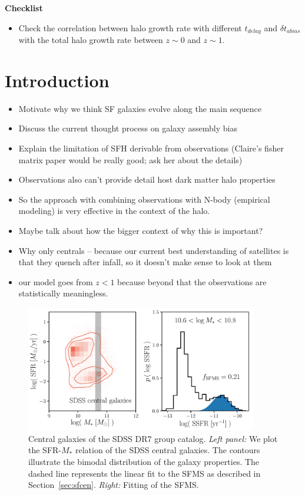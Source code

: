 \documentclass[12pt, letterpaper, preprint]{aastex}
\newcommand{\bitem}{\begin{itemize}}
\newcommand{\eitem}{\end{itemize}}
\begin{document}
{\bf Checklist} 
\bitem
\item Check the correlation between halo growth rate with different $t_{delay}$ and $\delta t_{abias}$ with the total halo growth rate between $z \sim 0$ and $z \sim 1$. 
\eitem 

\section{Introduction}
\bitem 
\item Motivate why we think SF galaxies evolve along the main sequence  
\item Discuss the current thought process on galaxy assembly bias 
\item Explain the limitation of SFH derivable from observations (Claire's fisher matrix paper would be really good; ask her about the details) 
\item Observations also can't provide detail host dark matter halo properties
\item So the approach with combining observations with N-body (empirical modeling) is very effective in the context of the halo.
\item Maybe talk about how the bigger context of why this is important?  
\item Why only centrals -- because our current best understanding of satellites is that they quench after infall, so it doesn't make sense to look at them
\item our model goes from $z < 1$ because beyond that the observations are statistically meaningless.  
\eitem 

\begin{figure}
\begin{center}
\includegraphics[width=0.9\textwidth]{figs/groupcat.pdf}
    \caption{Central galaxies of the SDSS DR7 group catalog. \emph{Left panel:} We plot 
    the SFR-$M_*$ relation of the SDSS central galaxies. The contours illustrate the bimodal
    distribution of the galaxy properties. The dashed line represents the linear fit to the 
    SFMS as described in Section~\ref{sec:sfcen}. 
    \emph{Right:}
    Fitting of the SFMS.}
\label{fig:groupcat}
\end{center}
\end{figure}
\end{document}
